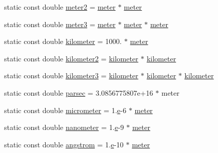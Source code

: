 \begin{DoxyCompactItemize}
\item 
static const double \hyperlink{namespacedd4hep_afe718b0d811af6b4d45c556e3a0e87a3}{meter2} = \hyperlink{namespacedd4hep_a46f5cf0231796af4296a307a58812b06}{meter} $\ast$ \hyperlink{namespacedd4hep_a46f5cf0231796af4296a307a58812b06}{meter}
\item 
static const double \hyperlink{namespacedd4hep_a4f771b88b1ff2018c0dacd3a1b56023b}{meter3} = \hyperlink{namespacedd4hep_a46f5cf0231796af4296a307a58812b06}{meter} $\ast$ \hyperlink{namespacedd4hep_a46f5cf0231796af4296a307a58812b06}{meter} $\ast$ \hyperlink{namespacedd4hep_a46f5cf0231796af4296a307a58812b06}{meter}
\item 
static const double \hyperlink{namespacedd4hep_a689bd0289c6c83e392d385bc870a34ab}{kilometer} = 1000. $\ast$ \hyperlink{namespacedd4hep_a46f5cf0231796af4296a307a58812b06}{meter}
\item 
static const double \hyperlink{namespacedd4hep_a61bb5393f7b8ec3694cb8e522145695f}{kilometer2} = \hyperlink{namespacedd4hep_a689bd0289c6c83e392d385bc870a34ab}{kilometer} $\ast$ \hyperlink{namespacedd4hep_a689bd0289c6c83e392d385bc870a34ab}{kilometer}
\item 
static const double \hyperlink{namespacedd4hep_a4501dea229a9ace2c46c427c69ddb5aa}{kilometer3} = \hyperlink{namespacedd4hep_a689bd0289c6c83e392d385bc870a34ab}{kilometer} $\ast$ \hyperlink{namespacedd4hep_a689bd0289c6c83e392d385bc870a34ab}{kilometer} $\ast$ \hyperlink{namespacedd4hep_a689bd0289c6c83e392d385bc870a34ab}{kilometer}
\item 
static const double \hyperlink{namespacedd4hep_a6d097c8b8fee88c7f77ebdfe2923ac45}{parsec} = 3.\+0856775807e+16 $\ast$ meter
\item 
static const double \hyperlink{namespacedd4hep_ae1c0791e549db4ff640f02a54c2e4e11}{micrometer} = 1.\hyperlink{_volumes_8cpp_a8a9a1f93e9b09afccaec215310e64142}{e}-\/6 $\ast$ \hyperlink{namespacedd4hep_a46f5cf0231796af4296a307a58812b06}{meter}
\item 
static const double \hyperlink{namespacedd4hep_af784647fab76654e26b09a341d3f9210}{nanometer} = 1.\hyperlink{_volumes_8cpp_a8a9a1f93e9b09afccaec215310e64142}{e}-\/9 $\ast$ \hyperlink{namespacedd4hep_a46f5cf0231796af4296a307a58812b06}{meter}
\item 
static const double \hyperlink{namespacedd4hep_a82387b0906ee031cb7ef93723f99c474}{angstrom} = 1.\hyperlink{_volumes_8cpp_a8a9a1f93e9b09afccaec215310e64142}{e}-\/10 $\ast$ \hyperlink{namespacedd4hep_a46f5cf0231796af4296a307a58812b06}{meter}
\item 

\end{DoxyCompactItemize}
